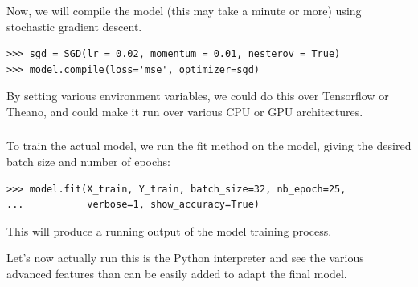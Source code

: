 \documentclass[xetex,mathserif,serif,aspectratio=169]{beamer}
\begin{document}
\begin{frame}[fragile] \frametitle{} \oldB \small

\textbf{}

Now, we will compile the model (this may take a minute
or more) using stochastic gradient descent.
\begin{verbatim}
>>> sgd = SGD(lr = 0.02, momentum = 0.01, nesterov = True)
>>> model.compile(loss='mse', optimizer=sgd)
\end{verbatim}
By setting various environment variables, we could do this
over Tensorflow or Theano, and could make it run over
various CPU or GPU architectures.

\end{frame}

\begin{frame}[fragile] \frametitle{} \oldB \small

\textbf{}

To train the actual model, we run the fit method on
the model, giving the desired batch size and number
of epochs:
\begin{verbatim}
>>> model.fit(X_train, Y_train, batch_size=32, nb_epoch=25,
...           verbose=1, show_accuracy=True)
\end{verbatim}
This will produce a running output of the model training
process.

\pause Let's now actually run this is the Python interpreter
and see the various advanced features than can be easily added
to adapt the final model.

\end{frame}
\end{document}
